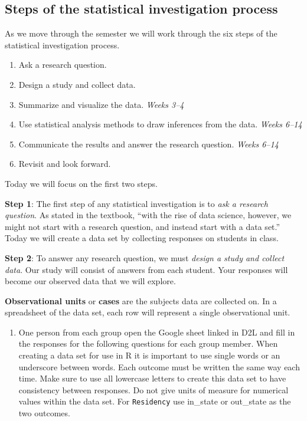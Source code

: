 \documentclass[
]{report}
\providecommand{\tightlist}{%
  \setlength{\itemsep}{0pt}\setlength{\parskip}{0pt}}
\begin{document}
\hypertarget{steps-of-the-statistical-investigation-process}{%
\subsection{Steps of the statistical investigation process}\label{steps-of-the-statistical-investigation-process}}

As we move through the semester we will work through the six steps of the statistical investigation process.

\begin{enumerate}
\def\labelenumi{\arabic{enumi}.}
\item
  Ask a research question.
\item
  Design a study and collect data.
\item
  Summarize and visualize the data. \emph{Weeks 3--4}
\item
  Use statistical analysis methods to draw inferences from the data. \emph{Weeks 6--14}
\item
  Communicate the results and answer the research question. \emph{Weeks 6--14}
\item
  Revisit and look forward.
\end{enumerate}

Today we will focus on the first two steps.

\textbf{Step 1}: The first step of any statistical investigation is to \emph{ask a research question}. As stated in the textbook, ``with the rise of data science, however, we might not start with a research question, and instead start with a data set.'' Today we will create a data set by collecting responses on students in class.

\textbf{Step 2}: To answer any research question, we must \emph{design a study and collect data}. Our study will consist of answers from each student. Your responses will become our observed data that we will explore.

\textbf{Observational units} or \textbf{cases} are the subjects data are collected on. In a spreadsheet of the data set, each row will represent a single observational unit.

\newpage

\begin{enumerate}
\def\labelenumi{\arabic{enumi}.}
\tightlist
\item
  One person from each group open the Google sheet linked in D2L and fill in the responses for the following questions for each group member. When creating a data set for use in R it is important to use single words or an underscore between words. Each outcome must be written the same way each time. Make sure to use all lowercase letters to create this data set to have consistency between responses. Do not give units of measure for numerical values within the data set. For \texttt{Residency} use in\_state or out\_state as the two outcomes.
\end{enumerate}
\end{document}
